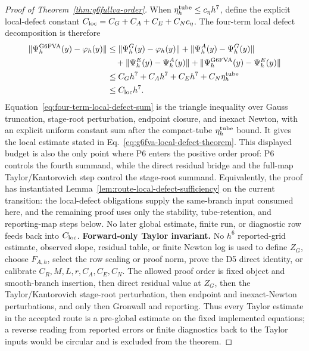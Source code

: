 \documentclass[preprint,12pt]{elsarticle}
\begin{document}
\begin{proof}[Proof of Theorem~\ref{thm:g6fullva-order}]
When \(\eta_h^{\rm tube}\le c_\eta h^7\), define the explicit local-defect constant
\(C_{\rm loc}=C_G+C_A+C_E+C_Nc_\eta\).
The four-term local defect decomposition is therefore
\begin{equation}
\label{eq:four-term-local-defect-sum}
\begin{aligned}
  \|\Psi_h^{\mathrm{G6FVA}}(y)-\varphi_h(y)\|
  &\le
  \|\Psi_h^G(y)-\varphi_h(y)\|
  +\|\Psi_h^A(y)-\Psi_h^G(y)\|  \\
  &\quad
  +\|\Psi_h^E(y)-\Psi_h^A(y)\|
  +\|\Psi_h^{\mathrm{G6FVA}}(y)-\Psi_h^E(y)\|  \\
  &\le C_Gh^7+C_Ah^7+C_Eh^7+C_N\eta_h^{\rm tube}  \\
  &\le C_{\rm loc}h^7 .
\end{aligned}
\end{equation}
Equation~\eqref{eq:four-term-local-defect-sum} is the triangle inequality over Gauss truncation, stage-root
perturbation, endpoint closure, and inexact Newton, with an explicit uniform
constant sum after the compact-tube \(\eta_h^{\rm tube}\) bound. It gives
the local estimate stated in Eq.~\eqref{eq:g6fva-local-defect-theorem}.
This displayed budget is also the only point where P6 enters the positive
order proof: P6 controls the fourth summand, while the direct residual bridge
and the full-map Taylor/Kantorovich step control the stage-root summand.
Equivalently, the proof has instantiated
Lemma~\ref{lem:route-local-defect-sufficiency} on the current transition:
the local-defect obligations supply the same-branch input consumed here, and
the remaining proof uses only the stability, tube-retention, and reporting-map
steps below. No later global estimate, finite run, or diagnostic row feeds back
into \(C_{\rm loc}\).
\noindent\textbf{Forward-only Taylor invariant.}
No \(h^6\) reported-grid estimate, observed slope, residual table, or finite Newton
log is used to define \(Z_G\), choose \(F_{A,h}\), select the row scaling or
proof norm, prove the D5 direct identity, or calibrate
\(C_R,M,L,r,C_A,C_E,C_N\).  The allowed proof order is fixed object and
smooth-branch insertion, then direct residual value at \(Z_G\), then the
Taylor/Kantorovich stage-root perturbation, then endpoint and inexact-Newton
perturbations, and only then Gronwall and reporting.  Thus every Taylor
estimate in the accepted route is a pre-global estimate on the fixed
implemented equations; a reverse reading from reported errors or finite
diagnostics back to the Taylor inputs would be circular and is excluded from
the theorem.


\end{proof}
\end{document}
